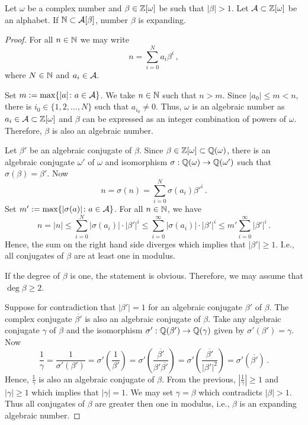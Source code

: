 \begin{theo}
\label{thm:betaExpanding}
    Let $\omega$ be a complex number and $\beta \in\mathbb{Z}[\omega]$ be such that $|\beta|>1$. Let $\mathcal{A}\subset \mathbb{Z}[\omega]$ be an alphabet. If $\mathbb{N}\subset \mathcal{A}[\beta]$, number $\beta$ is expanding.
\end{theo}
\begin{proof}
For all $n\in\mathbb{N}$ we may write 
    $$
    n=\sum_{i=0}^{N}a_i\beta^i\,,
    $$
    where $N\in\mathbb{N}$ and $a_i\in\mathcal{A}$.
    
    Set $m:= \max\{|a|\colon a\in\mathcal{A}\}$. We take $n\in\mathbb{N}$ such that $n>m$. 
    Since $|a_0|\leq m<n$, there is $i_0 \in \{1,2,\dots,N\}$ such that $a_{i_0}\neq 0$. Thus, $\omega$ is an algebraic number as $a_i\in\mathcal{A}\subset\mathbb{Z}[\omega]$ and $\beta$ can be expressed as an integer combination of powers of $\omega$. Therefore, $\beta$ is also an algebraic number.
    
    Let $\beta'$ be an algebraic conjugate of $\beta$.  
    Since $\beta\in\mathbb{Z}[\omega]\subset\mathbb{Q}(\omega)$, there is an algebraic conjugate $\omega'$ of $\omega$ and isomorphism $\sigma: \mathbb{Q}(\omega)\rightarrow \mathbb{Q}(\omega')$ such that $\sigma(\beta)=\beta'$. Now 
    $$
    n=\sigma(n)=\sum_{i=0}^{N}\sigma(a_i)\beta'^i\,.
    $$
    Set $m':= \max\{|\sigma(a)|\colon a\in\mathcal{A}\}$.  For all $n\in\mathbb{N}$, we have 
    $$
    n=|n|\leq\sum_{i=0}^{N}|\sigma(a_i)|\cdot|\beta'|^i \leq \sum_{i=0}^{\infty}|\sigma(a_i)|\cdot|\beta'|^i \leq m'\sum_{i=0}^{\infty}|\beta'|^i\,.  
    $$
    Hence, the sum on the right hand side diverges which implies that $|\beta'|\geq 1$. I.e., all conjugates of $\beta$ are at least one in modulus.
    
    If the degree of $\beta$ is one, the statement is obvious.  Therefore, we may assume that $\deg \beta \geq 2$. 
    
    Suppose  for contradiction that $|\beta'|=1$ for an algebraic conjugate $\beta'$  of $\beta$. The complex conjugate $\overline{\beta'}$ is also an algebraic conjugate of $\beta$. Take any algebraic conjugate $\gamma$ of $\beta$ and the isomorphism $\sigma': \mathbb{Q}(\beta')\rightarrow \mathbb{Q}(\gamma)$ given by $\sigma'(\beta')=\gamma$.
    Now
    $$
    \frac{1}{\gamma}=\frac{1}{\sigma'(\beta')}=\sigma'\left(\frac{1}{\beta'}\right)=\sigma'\left(\frac{\overline{\beta'}}{\beta'\overline{\beta'}}\right)=\sigma'\left(\frac{\overline{\beta'}}{|\beta'|^2}\right)=\sigma'(\overline{\beta'})\,.
    $$
    Hence, $\frac{1}{\gamma}$ is also an algebraic conjugate of $\beta$. From the previous, $\left|\frac{1}{\gamma}\right|\geq 1$ and $|\gamma|\geq 1$ which implies that $|\gamma|=1$. We may set $\gamma=\beta$ which contradicts $|\beta|>1$. Thus all conjugates of $\beta$ are greater then one in modulus, i.e., $\beta$ is an expanding algebraic number.
\end{proof}



